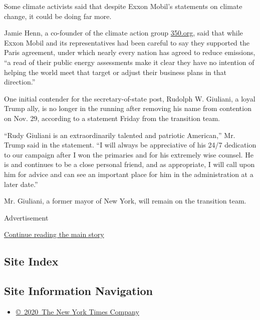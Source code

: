 Some climate activists said that despite Exxon Mobil's statements on
climate change, it could be doing far more.

Jamie Henn, a co-founder of the climate action group
\href{http://350.org/}{350.org}, said that while Exxon Mobil and its
representatives had been careful to say they supported the Paris
agreement, under which nearly every nation has agreed to reduce
emissions, ``a read of their public energy assessments make it clear
they have no intention of helping the world meet that target or adjust
their business plans in that direction.''

One initial contender for the secretary-of-state post, Rudolph W.
Giuliani, a loyal Trump ally, is no longer in the running after removing
his name from contention on Nov. 29, according to a statement Friday
from the transition team.

``Rudy Giuliani is an extraordinarily talented and patriotic American,''
Mr. Trump said in the statement. ``I will always be appreciative of his
24/7 dedication to our campaign after I won the primaries and for his
extremely wise counsel. He is and continues to be a close personal
friend, and as appropriate, I will call upon him for advice and can see
an important place for him in the administration at a later date.''

Mr. Giuliani, a former mayor of New York, will remain on the transition
team.

Advertisement

\protect\hyperlink{after-bottom}{Continue reading the main story}

\hypertarget{site-index}{%
\subsection{Site Index}\label{site-index}}

\hypertarget{site-information-navigation}{%
\subsection{Site Information
Navigation}\label{site-information-navigation}}

\begin{itemize}
\tightlist
\item
  \href{https://help.nytimes.com/hc/en-us/articles/115014792127-Copyright-notice}{©~2020~The
  New York Times Company}
\end{itemize}

